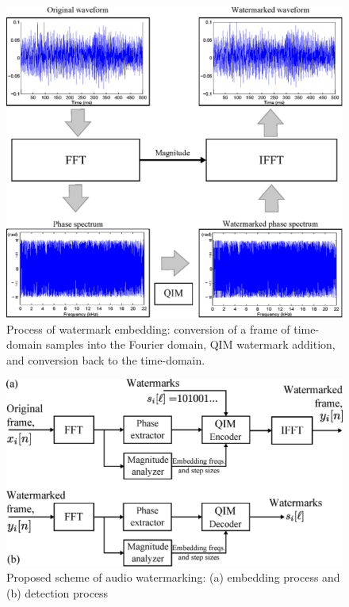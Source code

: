 \begin{figure}[tp]
\center
\includegraphics[width=1\columnwidth]{Illustrative_Example.eps}
\vspace{0mm}
\caption{Process of watermark embedding: conversion of a frame of time-domain samples into the Fourier domain, QIM watermark addition, and conversion back to the time-domain.
}
\label{fig:QIMWM_illustrative}
\vspace{0mm}
\end{figure}
\vspace{0mm}


\begin{figure}[tp]
\center
\includegraphics[width=1\columnwidth]{ProposedScheme.eps}
\caption{Proposed scheme of audio watermarking: (a) embedding process and (b) detection process}
\label{fig:WMScheme}
\end{figure}

